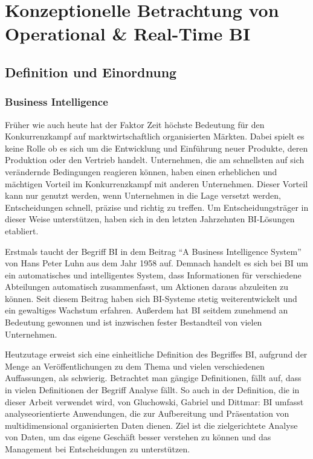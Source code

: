 \chapter{Konzeptionelle Betrachtung von Operational \& Real-Time BI}
\section{Definition und Einordnung}
\subsection{Business Intelligence}
Früher wie auch heute hat der Faktor Zeit höchste Bedeutung für den Konkurrenzkampf auf marktwirtschaftlich organisierten Märkten. Dabei spielt es keine Rolle ob es sich um die Entwicklung und Einführung neuer Produkte, deren Produktion oder den Vertrieb handelt. Unternehmen, die am schnellsten auf sich verändernde Bedingungen reagieren können, haben einen erheblichen und mächtigen Vorteil im Konkurrenzkampf mit anderen Unternehmen. \autocite[Vgl.][S. 1]{Stalk1988} Dieser Vorteil kann nur genutzt werden, wenn Unternehmen in die Lage versetzt werden, Entscheidungen schnell, präzise und richtig zu treffen. Um Entscheidungsträger in dieser Weise unterstützen, haben sich in den letzten Jahrzehnten \ac{BI}-Lösungen etabliert.

Erstmals taucht der Begriff \ac{BI} in dem Beitrag \enquote{A Business Intelligence System} von Hans Peter Luhn aus dem Jahr 1958 auf. Demnach handelt es sich bei \ac{BI} um ein automatisches und intelligentes System, dass Informationen für verschiedene Abteilungen automatisch zusammenfasst, um Aktionen daraus abzuleiten zu können. \autocite[Vgl.][S. 1]{Luhn1958ABI} Seit diesem Beitrag haben sich \ac{BI}-Systeme stetig weiterentwickelt und ein gewaltiges Wachstum erfahren. Außerdem hat \ac{BI} seitdem zunehmend an Bedeutung gewonnen und ist inzwischen fester Bestandteil von vielen Unternehmen. 

Heutzutage erweist sich eine einheitliche Definition des Begriffes \ac{BI}, aufgrund der Menge an Veröffentlichungen zu dem Thema und vielen verschiedenen Auffassungen, als schwierig. Betrachtet man gängige Definitionen, fällt auf, dass in vielen Definitionen der Begriff Analyse fällt. So auch in der Definition, die in dieser Arbeit verwendet wird, von Gluchowski, Gabriel und Dittmar: \ac{BI} umfasst analyseorientierte Anwendungen, die zur Aufbereitung und Präsentation von multidimensional organisierten Daten dienen. Ziel ist die zielgerichtete Analyse von Daten, um das eigene Geschäft besser verstehen zu können und das Management bei Entscheidungen zu unterstützen. \autocite[Vgl.][S. 89]{Glucho2008} 

